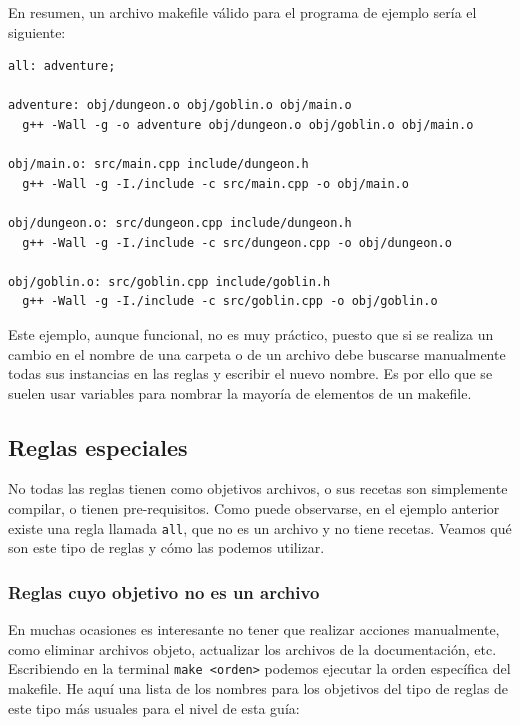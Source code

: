 \documentclass[11pt,twoside,titlepage,a4paper]{article}
\theoremstyle{definition}
\theoremstyle{plain_rojo}
\theoremstyle{remark}
\begin{document}
En resumen, un archivo makefile válido para el programa de ejemplo sería el
siguiente:

\begin{lstlisting}
all: adventure;

adventure: obj/dungeon.o obj/goblin.o obj/main.o
  g++ -Wall -g -o adventure obj/dungeon.o obj/goblin.o obj/main.o

obj/main.o: src/main.cpp include/dungeon.h
  g++ -Wall -g -I./include -c src/main.cpp -o obj/main.o

obj/dungeon.o: src/dungeon.cpp include/dungeon.h
  g++ -Wall -g -I./include -c src/dungeon.cpp -o obj/dungeon.o
  
obj/goblin.o: src/goblin.cpp include/goblin.h
  g++ -Wall -g -I./include -c src/goblin.cpp -o obj/goblin.o
\end{lstlisting}
\bigskip
Este ejemplo, aunque funcional, no es muy práctico, puesto que si se realiza 
un cambio en el nombre de una carpeta o de un archivo debe buscarse
manualmente todas sus instancias en las reglas y escribir el nuevo nombre. Es
por ello que se suelen usar variables para nombrar la mayoría de elementos de
un makefile.
\newpage
\subsection{Reglas especiales}

No todas las reglas tienen como objetivos archivos, o sus recetas son 
simplemente compilar, o tienen pre-requisitos. Como puede observarse, en el 
ejemplo anterior existe una regla llamada \texttt{all}, que no es un archivo
y no tiene recetas. Veamos qué son este tipo de reglas y cómo las podemos
utilizar.

\subsubsection{Reglas cuyo objetivo no es un archivo}

En muchas ocasiones es interesante no tener que realizar acciones 
manualmente, como eliminar archivos objeto, actualizar los archivos de la 
documentación, etc. Escribiendo en la terminal \texttt{make <orden>} podemos 
ejecutar la orden específica del makefile. He aquí una lista de los nombres 
para los objetivos del tipo de reglas de este tipo más usuales para el nivel
de esta guía:
\end{document}
